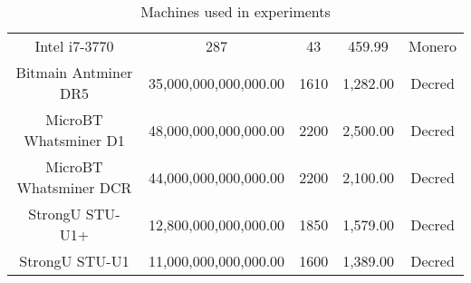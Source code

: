 \begin{table}[!ht]
{\begin{tabular}{|c|c|c|c|c|}
        Intel i7-3770 & 287 & 43 & 459.99 & Monero \\
        Bitmain Antminer DR5 & 35,000,000,000,000.00 & 1610 & 1,282.00 & Decred \\
        MicroBT Whatsminer D1 & 48,000,000,000,000.00 & 2200 & 2,500.00 & Decred \\
        MicroBT Whatsminer DCR & 44,000,000,000,000.00 & 2200 & 2,100.00 & Decred \\
        StrongU STU-U1+ & 12,800,000,000,000.00 & 1850 & 1,579.00 & Decred \\
        StrongU STU-U1 & 11,000,000,000,000.00 & 1600 & 1,389.00 & Decred \\
      \hline
    \end{tabular}
   }
  \caption{Machines used in experiments}
  \label{tbl:machines}
\end{table}
